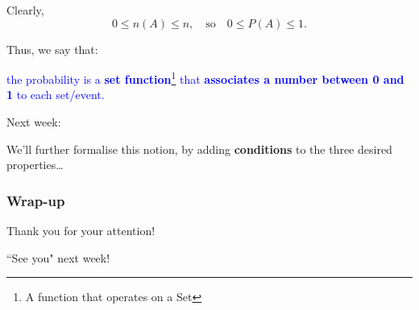 \documentclass[notes=show]{beamer}\usepackage[]{graphicx}\usepackage[]{color}
\newtheorem{remark}{Remark}[section]
\begin{document}
\begin{frame}{\secname}

Clearly,
$$0 \leq n(A) \leq n, \quad \text{so} \quad  0 \leq P(A) \leq 1.$$

Thus, we say that:

\begin{center}
\textcolor{blue}{the probability is a \textbf{set function}\footnote{A function that operates on a Set} that \textbf{associates a number between 0 and 1} to each set/event.}
\end{center}

\pause

Next week:

We'll further formalise this notion, by adding \textbf{conditions} to the three desired properties\dots
\end{frame}





\begin{frame}
\frametitle{Wrap-up}


\end{frame}


\begin{frame}
	\begin{center}

		\LARGE{Thank you for your attention!}

		\pause

		\LARGE{``See you" next week!}
	\end{center}
\end{frame}
\end{document}
